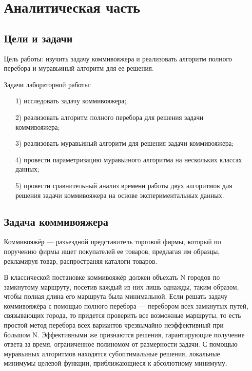 \chapter{Аналитическая часть}

\section{Цели и задачи}

Цель работы: изучить задачу коммивояжера и реализовать алгоритм полного перебора и муравьиный алгоритм для ее решения.

Задачи лабораторной работы:
\begin{enumerate}
	\item[1)] исследовать задачу коммивояжера;
	\item[2)] реализовать алгоритм полного перебора для решения задачи коммивояжера;
	\item[3)] реализовать муравьиный алгоритм для решения задачи коммивояжера;
	\item[4)] провести параметризацию муравьиного алгоритма на нескольких классах данных;
	\item[5)] провести сравнительный анализ времени работы двух алгоритмов для решения задачи коммивояжера на основе экспериментальных данных.
\end{enumerate}

\section{Задача коммивояжера}

Коммивояжёр --- разъездной представитель торговой фирмы, который по поручению фирмы ищет покупателей ее товаров, предлагая им образцы, рекламируя товар, распространяя каталоги товаров.

В классической постановке коммивояжёр должен объехать N городов по замкнутому маршруту, посетив каждый из них лишь однажды, таким образом, чтобы полная длина его маршрута была минимальной.
Если решать задачу коммивояжёра с помощью полного перебора --- перебором всех замкнутых путей, связывающих города, то придется проверить все возможные маршруты, то есть простой метод перебора всех вариантов чрезвычайно неэффективный при большом N. 
Эффективными же признаются решения, гарантирующие получение ответа за время, ограниченное полиномом от размерности задачи.
С помощью муравьиных алгоритмов находятся субоптимальные решения, локальные минимумы целевой функции, приближающиеся к абсолютному минимуму.

